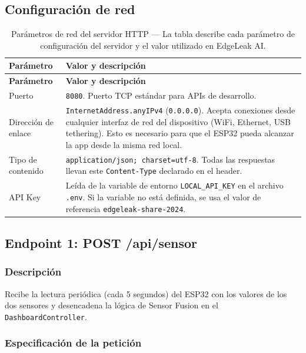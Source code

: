 \documentclass[12pt,a4paper]{article}
\begin{document}
\subsection{Configuración de red}

\begin{longtable}{p{4cm} p{9.5cm}}
\caption{Parámetros de red del servidor HTTP --- La tabla describe cada parámetro
  de configuración del servidor y el valor utilizado en EdgeLeak AI.}
\label{tab:red} \\
\toprule
\textbf{Parámetro} & \textbf{Valor y descripción} \\
\midrule
\endfirsthead
\toprule
\textbf{Parámetro} & \textbf{Valor y descripción} \\
\midrule
\endhead
\bottomrule
\endlastfoot
Puerto & \texttt{8080}. Puerto TCP estándar para APIs de desarrollo. \\[0.5em]
Dirección de enlace & \texttt{InternetAddress.anyIPv4} (\texttt{0.0.0.0}). Acepta
  conexiones desde cualquier interfaz de red del dispositivo (WiFi, Ethernet, USB
  tethering). Esto es necesario para que el ESP32 pueda alcanzar la app desde la
  misma red local. \\[0.5em]
Tipo de contenido & \texttt{application/json; charset=utf-8}. Todas las respuestas
  llevan este \texttt{Content-Type} declarado en el header. \\[0.5em]
API Key & Leída de la variable de entorno \texttt{LOCAL\_API\_KEY} en el archivo
  \texttt{.env}. Si la variable no está definida, se usa el valor de referencia
  \texttt{edgeleak-share-2024}. \\
\end{longtable}

\subsection{Endpoint 1: POST /api/sensor}

\subsubsection{Descripción}

Recibe la lectura periódica (cada 5 segundos) del ESP32 con los valores de los dos
sensores y desencadena la lógica de Sensor Fusion en el \texttt{DashboardController}.

\subsubsection{Especificación de la petición}
\end{document}
